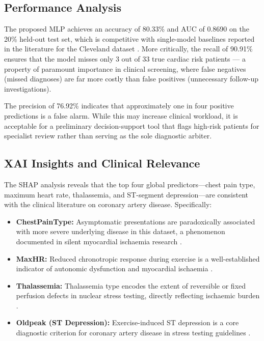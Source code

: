 \documentclass[conference]{IEEEtran}
\begin{document}
\subsection{Performance Analysis}

The proposed MLP achieves an accuracy of 80.33\% and AUC of 0.8690 on the 20\% held-out test set, which is competitive with single-model baselines reported in the literature for the Cleveland dataset \cite{palaniappan2008intelligent, shah2020heart}. More critically, the recall of 90.91\% ensures that the model misses only 3 out of 33 true cardiac risk patients — a property of paramount importance in clinical screening, where false negatives (missed diagnoses) are far more costly than false positives (unnecessary follow-up investigations).

The precision of 76.92\% indicates that approximately one in four positive predictions is a false alarm. While this may increase clinical workload, it is acceptable for a preliminary decision-support tool that flags high-risk patients for specialist review rather than serving as the sole diagnostic arbiter.

\subsection{XAI Insights and Clinical Relevance}

The SHAP analysis reveals that the top four global predictors—chest pain type, maximum heart rate, thalassemia, and ST-segment depression—are consistent with the clinical literature on coronary artery disease. Specifically:

\begin{itemize}
    \item \textbf{ChestPainType:} Asymptomatic presentations are paradoxically associated with more severe underlying disease in this dataset, a phenomenon documented in silent myocardial ischaemia research \cite{cohn1988silent}.
    \item \textbf{MaxHR:} Reduced chronotropic response during exercise is a well-established indicator of autonomic dysfunction and myocardial ischaemia \cite{gibbons2002acc}.
    \item \textbf{Thalassemia:} Thalassemia type encodes the extent of reversible or fixed perfusion defects in nuclear stress testing, directly reflecting ischaemic burden \cite{detrano1989international}.
    \item \textbf{Oldpeak (ST Depression):} Exercise-induced ST depression is a core diagnostic criterion for coronary artery disease in stress testing guidelines \cite{gibbons2002acc}.
\end{itemize}
\end{document}
